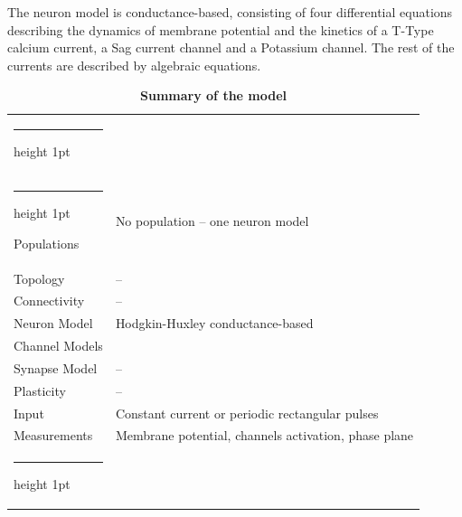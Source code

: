 \documentclass[10pt,a4paper,onecolumn]{article}
\makeatletter
\newcommand{\thickhline}{%
    \noalign {\ifnum 0=`}\fi \hrule height 1pt
    \futurelet \reserved@a \@xhline
}
\makeatother
\begin{document}
The neuron model is conductance-based, consisting of four differential
equations describing the dynamics of membrane potential and the kinetics of
a T-Type calcium current, a Sag current channel and a Potassium channel. The
rest of the currents are described by algebraic equations.
\begin{table}[!htbp]
    \centering
    \begin{tabular}{ll}
        \thickhline
        \multicolumn{2}{c}{Model Summary} \\\thickhline
        \rowcolor{Gray}
        Populations  & No population -- one neuron model \\\rowcolor{LightGray}
        Topology     & -- \\ \rowcolor{Gray}
        Connectivity & -- \\ \rowcolor{LightGray}
        Neuron Model & Hodgkin-Huxley conductance-based \\\rowcolor{Gray}
        Channel Models & \\ \rowcolor{LightGray}
        Synapse Model & -- \\ \rowcolor{Gray}
        Plasticity & -- \\ \rowcolor{LightGray}
        Input & Constant current or periodic rectangular pulses \\\rowcolor{Gray}
        Measurements & Membrane potential, channels activation, phase plane \\
        \thickhline
    \end{tabular}
    \caption{{\bfseries \sffamily Summary of the model}} 
    \label{Table:1}
\end{table}
\end{document}
